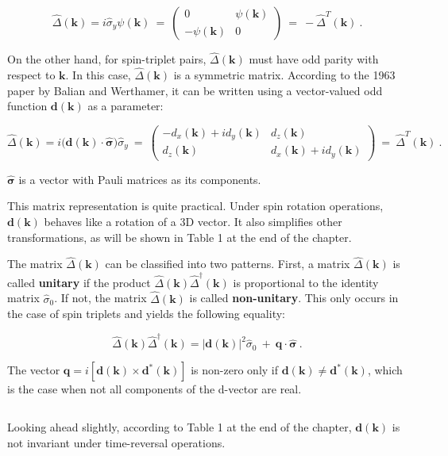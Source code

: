 \documentclass[uplatex,a4j,12pt,dvipdfmx]{jsarticle}
\begin{document}
\[
	\hat{\Delta}(\bm{k})
	=
	i \hat{\sigma}_{y} \psi(\bm{k})
	\ = \
	\left(
	\begin{array}{cc}
			0              & \psi(\bm{k}) \\
			- \psi(\bm{k}) & 0
		\end{array}
	\right)
	\ = \
	- \hat{\Delta}^{T}(\bm{k})
	\ .
\]

On the other hand, for spin-triplet pairs, $\hat{\Delta}(\bm{k})$ must have odd parity with respect to $\bm{k}$.
In this case, $\hat{\Delta}(\bm{k})$ is a symmetric matrix.
According to the 1963 paper by Balian and Werthamer, it can be written using a vector-valued odd function $\bm{d}(\bm{k})$ as a parameter:

\[
	\hat{\Delta}(\bm{k})
	=
	i \Big( \bm{d}(\bm{k}) \cdot \hat{\bm{\sigma}} \Big) \hat{\sigma}_{y}
	\ = \
	\left(
	\begin{array}{cc}
			- d_{x}(\bm{k}) + i d_{y}(\bm{k}) & d_{z}(\bm{k})                   \\
			d_{z}(\bm{k})                     & d_{x}(\bm{k}) + i d_{y}(\bm{k})
		\end{array}
	\right)
	\ = \
	\hat{\Delta}^{T}(\bm{k})
	\ .
\]

$\hat{\bm{\sigma}}$ is a vector with Pauli matrices as its components.

This matrix representation is quite practical.
Under spin rotation operations, $\bm{d}(\bm{k})$ behaves like a rotation of a 3D vector.
It also simplifies other transformations, as will be shown in Table 1 at the end of the chapter.

The matrix $\hat{\Delta}(\bm{k})$ can be classified into two patterns.
First, a matrix $\hat{\Delta}(\bm{k})$ is called \textbf{unitary} if the product $\hat{\Delta}(\bm{k}) \hat{\Delta}^{\dagger}(\bm{k})$ is proportional to the identity matrix $\hat{\sigma}_{0}$.
If not, the matrix $\hat{\Delta}(\bm{k})$ is called \textbf{non-unitary}.
This only occurs in the case of spin triplets and yields the following equality:

\[
	\hat{\Delta}(\bm{k}) \hat{\Delta}^{\dagger}(\bm{k})
	=
	|\bm{d}(\bm{k})|^{2} \hat{\sigma}_{0}
	\ + \
	\bm{q} \cdot \hat{\bm{\sigma}}
	\ .
\]

The vector $\bm{q}=i [ \bm{d}(\bm{k}) \times \bm{d}^{*}(\bm{k}) ]$ is non-zero only if $\bm{d}(\bm{k}) \neq \bm{d}^{*}(\bm{k})$, which is the case when not all components of the d-vector are real.

${}$

Looking ahead slightly, according to Table 1 at the end of the chapter, $\bm{d}(\bm{k})$ is not invariant under time-reversal operations.
\end{document}

